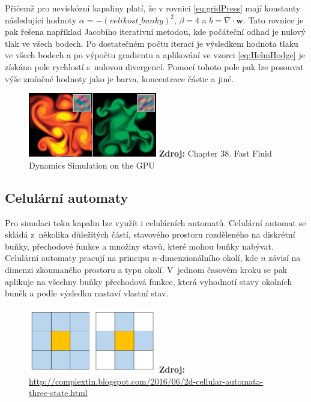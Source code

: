 Přičemž pro neviskózní kapaliny platí, že v rovnici \ref{eq:gridPress} mají konstanty následující hodnoty $\alpha = -( velikost\_bunky )^2$, $\beta = 4$ a $b = \nabla \cdot \mathbf{w}$. Tato rovnice je pak řešena například Jacobiho iterativní metodou, kde počáteční odhad je nulový tlak ve všech bodech. Po dostatečném počtu iterací je výsledkem hodnota tlaku ve všech bodech a po výpočtu gradientu a aplikování ve vzorci \ref{eq:HelmHodge} je získáno pole rychlostí s~nulovou divergencí. Pomocí tohoto pole pak lze posouvat výše zmíněné hodnoty jako je barva, koncentrace částic a jiné.
\cite{GPUGemsGridFLuid}

\begin{figure}[hbt]
	\centering
	\captionsetup{justification=centering}
	\includegraphics[width=0.5\textwidth]{obrazky-figures/GridFluid.jpg}
	\textbf{Zdroj: } Chapter 38. Fast Fluid Dynamics Simulation on the GPU \cite{GPUGemsGridFLuid}
	\label{fig:EulerFluid}
\end{figure}

\subsection{Celulární automaty}
Pro simulaci toku kapalin lze využít i celulárních automatů. Celulární automat se skládá z~několika důležitých částí, stavového prostoru rozděleného na diskrétní buňky, přechodové funkce a množiny stavů, které mohou buňky nabývat. Celulární automaty pracují na principu $n$-dimenzionálního okolí, kde $n$ závisí na dimenzi zkoumaného prostoru a typu okolí. V~jednom časovém kroku se pak aplikuje na všechny buňky přechodová funkce, která vyhodnotí stavy okolních buněk a podle výsledku nastaví vlastní stav.

\begin{figure}[hbt]
	\centering
	\captionsetup{justification=centering}
	\includegraphics[width=0.5\textwidth]{obrazky-figures/Neighborhood.png}
	\textbf{Zdroj: } \url{http://complextin.blogspot.com/2016/06/2d-cellular-automata-three-state.html}
	\label{fig:neighbours}
\end{figure}

